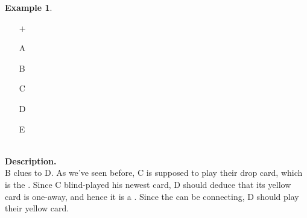 \documentclass[a4paper]{article}
\theoremstyle{plain}
\theoremstyle{definition}
\newtheorem{example}[theorem]{Example}
\begin{document}
\begin{example}	\hfill \\
	\begin{minipage}{0.45\textwidth}
		\begin{itemize}
			\item[\Large +]      
			\item[\Large A]    
			\item[\Large B]    
			\item[\Large C]    
			\item[\Large D]    
			\item[\Large E]    
		\end{itemize}
	\end{minipage}%
	\begin{minipage}{0.55\textwidth}
		\hfill \\
		
		\textbf{Description.} \\
		
		B clues  to D. As we've seen before, C is supposed to play their drop card, which is the . Since C blind-played his newest card, D should deduce that its yellow card is one-away, and hence it is a . Since the  can be connecting, D should play their yellow card.
	\end{minipage}
\end{example} \vspace{0.15 cm}
\end{document}
